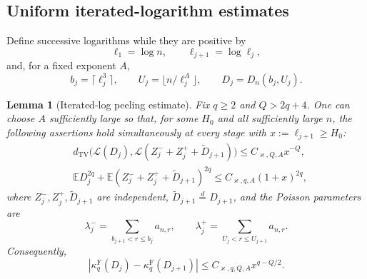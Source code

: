 \documentclass[11pt]{article}
\numberwithin{equation}{section}
\newcommand{\E}{\mathbb E}
\newcommand{\TV}{d_{\mathrm{TV}}}
\newcommand{\cL}{\mathcal L}
\newtheorem{lemma}[theorem]{Lemma}
\theoremstyle{definition}
\theoremstyle{remark}
\begin{document}
\subsection{Uniform iterated-logarithm estimates}

Define successive logarithms while they are positive by
\[
 \ell_1=\log n,\qquad \ell_{j+1}=\log\ell_j,
\]
and, for a fixed exponent $A$,
\[
 b_j=\lceil\ell_j^3\rceil,\qquad
 U_j=\lfloor n/\ell_j^A\rfloor,\qquad D_j=D_n(b_j,U_j).
\]

\begin{lemma}[Iterated-log peeling estimate]\label{lem:iterated-peel}
Fix $q\ge2$ and $Q>2q+4$.  One can choose $A$ sufficiently large so that,
for some $H_0$ and all sufficiently large $n$, the following assertions
hold simultaneously at every stage with $x:=\ell_{j+1}\ge H_0$:
\begin{align}
 &\TV\bigl(\cL(D_j),
    \cL(Z_j^-+Z_j^++\widetilde D_{j+1})\bigr)
      \le C_{\varkappa,Q,A}x^{-Q},
 \label{eq:iterated-tv}\\
 &\E D_j^{2q}
  +\E(Z_j^-+Z_j^++\widetilde D_{j+1})^{2q}
      \le C_{\varkappa,q,A}(1+x)^{2q},
 \label{eq:iterated-moments}
\end{align}
where $Z_j^-,Z_j^+,\widetilde D_{j+1}$ are independent,
$\widetilde D_{j+1}\overset d=D_{j+1}$, and the Poisson parameters are
\[
 \lambda_j^- =\sum_{b_{j+1}<r\le b_j}a_{n,r},\qquad
 \lambda_j^+ =\sum_{U_j<r\le U_{j+1}}a_{n,r}.
\]
Consequently,
\begin{equation}\label{eq:cumulant-step}
 \left|\kappa_q^{\mathrm F}(D_j)-\kappa_q^{\mathrm F}(D_{j+1})\right|
 \le C_{\varkappa,q,Q,A}x^{q-Q/2}.
\end{equation}
\end{lemma}
\end{document}
